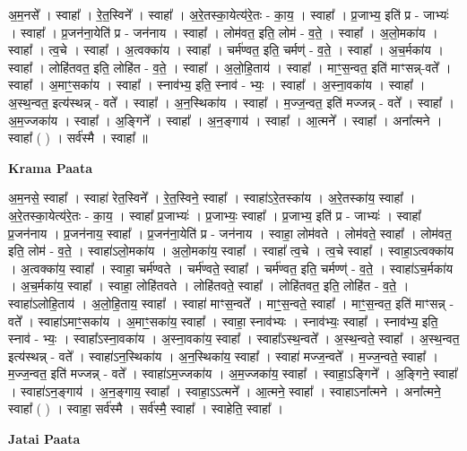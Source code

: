 \documentclass[17pt]{extarticle}
\begin{document}
अ॒म॒नसे᳚ । स्वाहा᳚ । रे॒त॒स्विने᳚ । स्वाहा᳚ । अ॒रे॒तस्का॒येत्य॑रे॒तः - का॒य॒ । स्वाहा᳚ । प्र॒जाभ्य॒ इति॑ प्र - जाभ्यः॑ । स्वाहा᳚ । प्र॒जन॑ना॒येति॑ प्र - जन॑नाय । स्वाहा᳚ । लोम॑वत॒ इति॒ लोम॑ - व॒ते॒ । स्वाहा᳚ । अ॒लो॒मका॑य । स्वाहा᳚ । त्व॒चे । स्वाहा᳚ । अ॒त्वक्का॑य । स्वाहा᳚ । चर्म॑ण्वत॒ इति॒ चर्मण्॑ -   व॒ते॒ । स्वाहा᳚ । अ॒च॒र्मका॑य । स्वाहा᳚ । लोहि॑तवत॒ इति॒ लोहि॑त - व॒ते॒ । स्वाहा᳚ । अ॒लो॒हि॒ताय॑ । स्वाहा᳚ । माꣳ॒॒स॒न्वत॒ इति॑ माꣳसन्न्-वते᳚ । स्वाहा᳚ । अ॒माꣳ॒॒सका॑य । स्वाहा᳚ । स्नाव॑भ्य॒ इति॒ स्नाव॑ - भ्यः॒ । स्वाहा᳚ । अ॒स्ना॒वका॑य । स्वाहा᳚ । अ॒स्थ॒न्वत॒ इत्य॑स्थन्न् - वते᳚ । स्वाहा᳚ । अ॒न॒स्थिका॑य । स्वाहा᳚ । म॒ज्ज॒न्वत॒ इति॑ मज्जन्न् - वते᳚ । स्वाहा᳚ । अ॒म॒ज्जका॑य । स्वाहा᳚ । अ॒ङ्गिने᳚ । स्वाहा᳚ । अ॒न॒ङ्गाय॑ । स्वाहा᳚ । आ॒त्मने᳚ । स्वाहा᳚ । अना᳚त्मने । स्वाहा᳚ ( ) । सर्व॑स्मै । स्वाहा᳚ ॥  \newline


\textbf{Krama Paata} \newline

अ॒म॒नसे॒ स्वाहा᳚ । स्वाहा॑ रेत॒स्विने᳚ । रे॒त॒स्विने॒ स्वाहा᳚ । स्वाहा॑ऽरे॒तस्का॑य । अ॒रे॒तस्का॑य॒ स्वाहा᳚ । अ॒रे॒तस्का॒येत्य॑रे॒तः - का॒य॒ । स्वाहा᳚ प्र॒जाभ्यः॑ । प्र॒जाभ्यः॒ स्वाहा᳚ । प्र॒जाभ्य॒ इति॑ प्र - जाभ्यः॑ । स्वाहा᳚ प्र॒जन॑नाय । प्र॒जन॑नाय॒ स्वाहा᳚ । प्र॒जन॑ना॒येति॑ प्र - जन॑नाय । स्वाहा॒ लोम॑वते । लोम॑वते॒ स्वाहा᳚ । लोम॑वत॒ इति॒ लोम॑ - व॒ते॒ । स्वाहा॑ऽलो॒मका॑य । अ॒लो॒मका॑य॒ स्वाहा᳚ । स्वाहा᳚ त्व॒चे । त्व॒चे स्वाहा᳚ । स्वाहा॒ऽत्वक्का॑य । अ॒त्वक्का॑य॒ स्वाहा᳚ । स्वाहा॒ चर्म॑ण्वते । चर्म॑ण्वते॒ स्वाहा᳚ । चर्म॑ण्वत॒ इति॒ चर्मण्ण्॑ - व॒ते॒ । स्वाहा॑ऽच॒र्मका॑य । अ॒च॒र्मका॑य॒ स्वाहा᳚ । स्वाहा॒ लोहि॑तवते । लोहि॑तवते॒ स्वाहा᳚ । लोहि॑तवत॒ इति॒ लोहि॑त - व॒ते॒ । स्वाहा॑ऽलोहि॒ताय॑ । अ॒लो॒हि॒ताय॒ स्वाहा᳚ । स्वाहा॑ माꣳस॒न्वते᳚ । माꣳ॒॒स॒न्वते॒ स्वाहा᳚ । माꣳ॒॒स॒न्वत॒ इति॑ माꣳसन्न् - वते᳚ । स्वाहा॑ऽमाꣳ॒॒सका॑य । अ॒माꣳ॒॒सका॑य॒ स्वाहा᳚ । स्वाहा॒ स्नाव॑भ्यः । स्नाव॑भ्यः॒ स्वाहा᳚ । स्नाव॑भ्य॒ इति॒ स्नाव॑ - भ्यः॒ । स्वाहा᳚ऽस्ना॒वका॑य । अ॒स्ना॒वका॑य॒ स्वाहा᳚ । स्वाहा᳚ऽस्थ॒न्वते᳚ । अ॒स्थ॒न्वते॒ स्वाहा᳚ । अ॒स्थ॒न्वत॒ इत्य॑स्थन्न् - वते᳚ । स्वाहा॑ऽन॒स्थिका॑य । अ॒न॒स्थिका॑य॒ स्वाहा᳚ । स्वाहा॑ मज्ज॒न्वते᳚ । म॒ज्ज॒न्वते॒ स्वाहा᳚ । म॒ज्ज॒न्वत॒ इति॑ मज्जन्न् - वते᳚ । स्वाहा॑ऽम॒ज्जका॑य । अ॒म॒ज्जका॑य॒ स्वाहा᳚ । स्वाहा॒ऽङ्‍गिने᳚ । अ॒ङ्‍गिने॒ स्वाहा᳚ । स्वाहा॑ऽन॒ङ्‍गाय॑ । अ॒न॒ङ्‍गाय॒ स्वाहा᳚ । स्वाहा॒ऽऽत्मने᳚ । आ॒त्मने॒ स्वाहा᳚ । स्वाहाऽना᳚त्मने । अना᳚त्मने॒ स्वाहा᳚ ( ) । स्वाहा॒ सर्व॑स्मै । सर्व॑स्मै॒ स्वाहा᳚ । स्वाहेति॒ स्वाहा᳚ । \newline

\textbf{Jatai Paata} \newline
\end{document}
